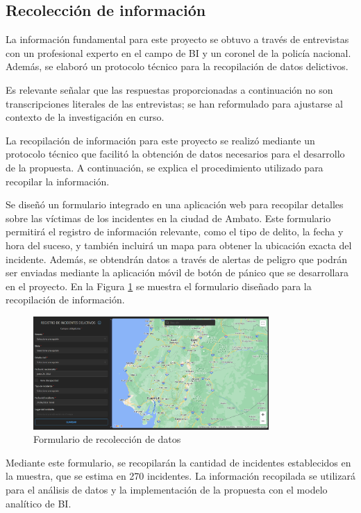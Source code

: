 \subsection{Recolección de información}

La información fundamental para este proyecto se obtuvo a través de entrevistas con un profesional experto
en el campo de BI y un coronel de la policía nacional. Además, se elaboró un protocolo técnico para la
recopilación de datos delictivos.
\bigbreak

Es relevante señalar que las respuestas proporcionadas a continuación no son transcripciones literales
de las entrevistas; se han reformulado para ajustarse al contexto de la investigación en curso.




La recopilación de información para este proyecto se realizó mediante un protocolo técnico que facilitó la
obtención de datos necesarios para el desarrollo de la propuesta. A continuación, se explica el procedimiento
utilizado para recopilar la información.
\bigbreak

Se diseñó un formulario integrado en una aplicación web para recopilar detalles sobre las víctimas de los incidentes
en la ciudad de Ambato. Este formulario permitirá el registro de información relevante, como el tipo de delito,
la fecha y hora del suceso, y también incluirá un mapa para obtener la ubicación exacta del incidente. Además,
se obtendrán datos a través de alertas de peligro que podrán ser enviadas mediante la aplicación móvil de botón
de pánico que se desarrollara en el proyecto. En la Figura \ref{fig:formulario-recoleccion-datos} se muestra el
formulario  diseñado para la recopilación de información.

\begin{figure}[H]
    \centering
    \includegraphics[width=0.8\textwidth]{chapters/II-metodologia/resources/images/formulario-recoleccion-datos.png}
    \caption{Formulario de recolección de datos}
    \label{fig:formulario-recoleccion-datos}
\end{figure}

Mediante este formulario, se recopilarán la cantidad de incidentes establecidos en la muestra, que se estima en 270
incidentes. La información recopilada se utilizará para el análisis de datos y la implementación de la propuesta con
el modelo analítico de BI.